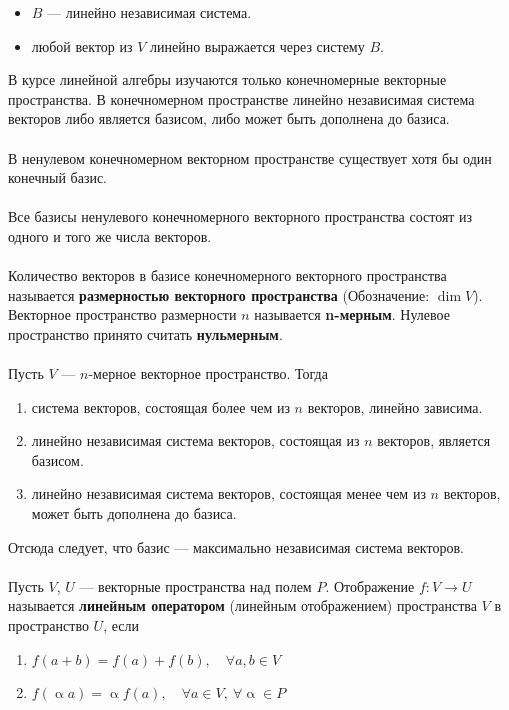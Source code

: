 \documentclass[a4paper, 12pt]{report}
\numberwithin{equation}{section}
\renewcommand{\alpha}{\upalpha}
\begin{document}
	\begin{itemize}
		\item {$B$ --- линейно независимая система.}
		\item {любой вектор из $V$ линейно выражается через систему $B$.}
	\end{itemize}
	В курсе линейной алгебры изучаются только конечномерные векторные пространства.
	В конечномерном пространстве линейно независимая система векторов либо является базисом, либо может быть дополнена до базиса. 
	\\\\
	В ненулевом конечномерном векторном пространстве существует хотя бы один конечный базис.
	\\\\
	Все базисы ненулевого конечномерного векторного пространства состоят из одного и того же числа векторов.
	\\\\
	{Количество векторов в базисе конечномерного векторного пространства называется \textbf{размерностью векторного пространства} (Обозначение: $\dim V$). Векторное пространство размерности $n$ называется \textbf{n-мерным}. Нулевое пространство принято считать \textbf{нульмерным}.}
	\\\\
	Пусть $V$ --- $n$-мерное векторное пространство. Тогда\begin{enumerate}
		\item система векторов, состоящая более чем из $n$ векторов, линейно зависима.
		\item линейно независимая система векторов, состоящая из $n$ векторов, является базисом.
		\item линейно независимая система векторов, состоящая менее чем из $n$ векторов, может быть дополнена до базиса.
	\end{enumerate}
	Отсюда следует, что базис --- максимально независимая система векторов.
	\\\\
	{Пусть $V$, $U$ --- векторные пространства над полем $P$. Отображение $f : V \rightarrow U$ называется \textbf{линейным оператором} (линейным отображением) пространства $V$ в пространство $U$, если}
	\begin{enumerate}
		\item $f(a+b) = f(a) + f(b),\quad \forall a,b \in V$
		\item $f(\alpha a) = \alpha f(a), \quad \forall a\in V,\  \forall \alpha \in P$
	\end{enumerate}
\end{document}
